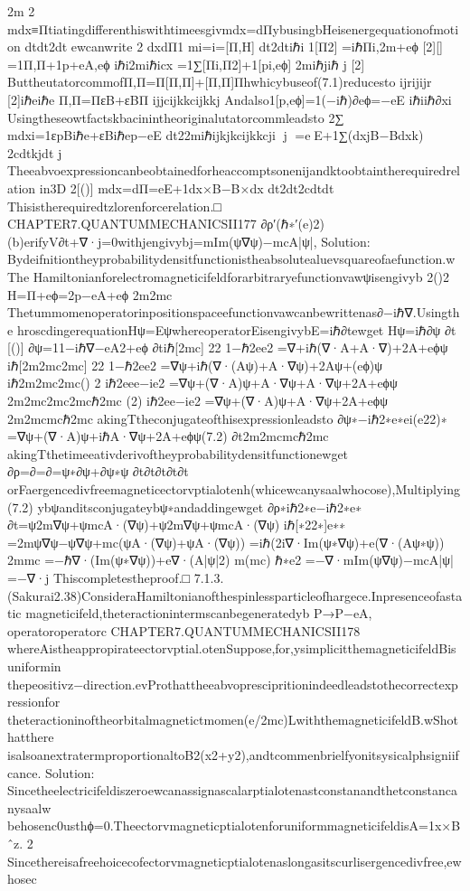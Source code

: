 {{{{{{{{{{2m
2
mdx≡Πtiatingdifferenthiswithtimeesgivmdx=dΠybusingbHeisenergequationofmotion
dtdt2dt
ewcanwrite
2
dxdΠ1
mi=i=[Π,H]
dt2dtiℏi
1[Π2]
=iℏΠi,2m+eϕ
[2][]
=1Π,Π+1p+eA,eϕ
iℏi2miℏicx
=1∑[Πi,Π2]+1[pi,eϕ]
2miℏjiℏ
j
[2]
ButtheutatorcommofΠ,Π=Π[Π,Π]+[Π,Π]Πhwhicybuseof(7.1)reducesto
ijrijijr
[2]iℏeiℏe
Π,Π=ΠεB+εBΠ
ijjcijkkcijkkj
Andalso1[p,eϕ]=1(−iℏ)∂eϕ=−eE
iℏiiℏ∂xi
Usingtheseowtfactskbacinintheoriginalutatorcommleadsto
2∑
mdxi=1εpBiℏe+εBiℏep−eE
dt22miℏijkjkcijkkcji
j
=eE+1∑(dxjB−Bdxk)
2cdtkjdt
j
Theeabvoexpressioncanbeobtainedforheaccomptsonenijandktoobtaintherequiredrelation
in3D
2[()]
mdx=dΠ=eE+1dx×B−B×dx
dt2dt2cdtdt
Thisistherequiredtzlorenforcerelation.□
CHAPTER7.QUANTUMMECHANICSII177
∂ρ′(ℏ∗′(e)2)
(b)erifyV∂t+∇·j=0withjengivybj=mIm(ψ∇ψ)−mcA|ψ|,
Solution:
Bydeifnitiontheyprobabilitydensitfunctionistheabsolutealuevsquareofaefunction.wThe
Hamiltonianforelectromagneticifeldforarbitraryefunctionvawψisengivyb
2()2
H=Π+eϕ=2p−eA+eϕ
2m2mc
Thetummomenoperatorinpositionspaceefunctionvawcanbewrittenas∂−iℏ∇.Usingthe
hroscdingerequationHψ=EψwhereoperatorEisengivybE=iℏ∂tewget
Hψ=iℏ∂ψ
∂t
[()]
∂ψ=11−iℏ∇−eA2+eϕ
∂tiℏ[2mc]
22
1−ℏ2ee2
=∇+iℏ(∇·A+A·∇)+2A+eϕψ
iℏ[2m2mc2mc]
22
1−ℏ2ee2
=∇ψ+iℏ(∇·(Aψ)+A·∇ψ)+2Aψ+(eϕ)ψ
iℏ2m2mc2mc()
2
iℏ2eee−ie2
=∇ψ+(∇·A)ψ+A·∇ψ+A·∇ψ+2A+eϕψ
2m2mc2mc2mcℏ2mc
(2)
iℏ2ee−ie2
=∇ψ+(∇·A)ψ+A·∇ψ+2A+eϕψ
2m2mcmcℏ2mc
akingTtheconjugateofthisexpressionleadsto
∂ψ∗−iℏ2∗e∗ei(e22)∗
=∇ψ+(∇·A)ψ+iℏA·∇ψ+2A+eϕψ(7.2)
∂t2m2mcmcℏ2mc
akingTthetimeeativderivoftheyprobabilitydensitfunctionewget
∂ρ=∂=∂=ψ∗∂ψ+∂ψ∗ψ
∂t∂t∂t∂t∂t
orFaergencedivfreemagneticectorvptialotenh(whicewcanysaalwhocose),Multiplying(7.2)
ybψanditsconjugateybψ∗andaddingewget
∂ρ∗iℏ2∗e−iℏ2∗e∗
∂t=ψ2m∇ψ+ψmcA·(∇ψ)+ψ2m∇ψ+ψmcA·(∇ψ)
iℏ[∗22∗]e∗∗
=2mψ∇ψ−ψ∇ψ+mc(ψA·(∇ψ)+ψA·(∇ψ))
=iℏ(2i∇·Im(ψ∗∇ψ)+e(∇·(Aψ∗ψ))
2mmc
=−ℏ∇·(Im(ψ∗∇ψ))+e∇·(A|ψ|2)
m(mc)
ℏ∗e2
=−∇·mIm(ψ∇ψ)−mcA|ψ|
=−∇·j
Thiscompletestheproof.□
7.1.3.(Sakurai2.38)ConsideraHamiltonianofthespinlessparticleofhargece.Inpresenceofastatic
magneticifeld,theteractionintermscanbegeneratedyb
P→P−eA,
operatoroperatorc
CHAPTER7.QUANTUMMECHANICSII178
whereAistheappropirateectorvptial.otenSuppose,for,ysimplicitthemagneticifeldBisuniformin
thepeositivz−direction.evProthattheeabvoprescipritionindeedleadstothecorrectexpressionfor
theteractioninoftheorbitalmagnetictmomen(e/2mc)LwiththemagneticifeldB.wShothatthere
isalsoanextratermproportionaltoB2(x2+y2),andtcommenbrielfyonitsysicalphsigniifcance.
Solution:
Sincetheelectricifeldiszeroewcanassignascalarptialotenastconstanandthetconstancanysaalw
behosenc0usthϕ=0.TheectorvmagneticptialotenforuniformmagneticifeldisA=1x×Bˆz.
2
Sincethereisafreehoicecofectorvmagneticptialotenaslongasitscurlisergencedivfree,ewhosec
}}}}}}}}}}
